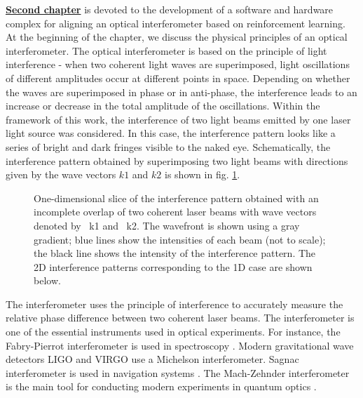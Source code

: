 \underline{\textbf{Second chapter}} is devoted to the development of a software and hardware complex for aligning an optical interferometer based on reinforcement learning. At the beginning of the chapter, we discuss the physical principles of an optical interferometer. The optical interferometer is based on the principle of light interference - when two coherent light waves are superimposed, light oscillations of different amplitudes occur at different points in space. Depending on whether the waves are superimposed in phase or in anti-phase, the interference leads to an increase or decrease in the total amplitude of the oscillations. Within the framework of this work, the interference of two light beams emitted by one laser light source was considered. In this case, the interference pattern looks like a series of bright and dark fringes visible to the naked eye. Schematically, the interference pattern obtained by superimposing two light beams with directions given by the wave vectors $k1$ and $k2$ is shown in fig. \ref{fig:two_beam_interf}.

\begin{figure}[ht]
    \caption{
    One-dimensional slice of the interference pattern obtained with an incomplete overlap of two coherent laser beams with wave vectors denoted by ~k1 and ~k2. The wavefront is shown using a gray gradient; blue lines show the intensities of each beam (not to scale); the black line shows the intensity of the interference pattern. The 2D interference patterns corresponding to the 1D case are shown below.}
\label{fig:two_beam_interf}
\end{figure}

The interferometer uses the principle of interference to accurately measure the relative phase difference between two coherent laser beams. The interferometer is one of the essential instruments used in optical experiments. For instance, the Fabry-Pierrot interferometer is used in spectroscopy \cite{fabry-perot1899}. Modern gravitational wave detectors LIGO and VIRGO \cite{LIGO, VIRGO} use a Michelson interferometer. Sagnac interferometer is used in navigation systems \cite{Kandpal2000}. The Mach-Zehnder interferometer is the main tool for conducting modern experiments in quantum optics \cite{Ourjoumtsev2006, Sychev2017}.


